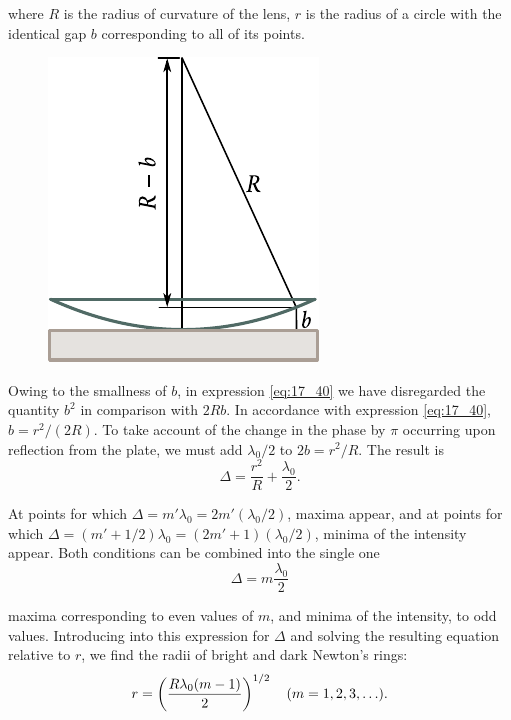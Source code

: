 \noindent
where $R$ is the radius of curvature of the lens, $r$ is the radius of a circle with the identical gap $b$ corresponding to all of its points.

\begin{figure}[t]
	\begin{center}
		\includegraphics[scale=1]{figures/ch_17/fig_17_15.pdf}
		\caption[]{}
		\label{fig:17_15}
	\end{center}
	\vspace{-0.8cm}
\end{figure}

Owing to the smallness of $b$, in expression \eqref{eq:17_40} we have disregarded the quantity $b^2$ in comparison with $2Rb$.
In accordance with expression \eqref{eq:17_40}, $b=r^2/(2R)$.
To take account of the change in the phase by $\pi$ occurring upon reflection from the plate, we must add $\lambda_0/2$ to $2b=r^2/R$.
The result is
\begin{equation}\label{eq:17_41}
    \Delta = \frac{r^2}{R} + \frac{\lambda_0}{2}.
\end{equation}

At points for which $\Delta=m'\lambda_0 = 2m'(\lambda_0/2)$, maxima appear, and at points for which $\Delta=(m'+1/2) \lambda_0 = (2m'+1)(\lambda_0/2)$, minima of the intensity appear.
Both conditions can be combined into the single one
\begin{equation*}
    \Delta = m \frac{\lambda_0}{2}
\end{equation*}

\noindent
maxima corresponding to even values of $m$, and minima of the intensity, to odd values.
Introducing into this expression  for $\Delta$ and solving the resulting equation relative to $r$, we find the radii of bright and dark Newton's rings:
\begin{equation}\label{eq:17_42}
    r = \left(\frac{R \lambda_0 (m-1)}{2}\right)^{1/2}\quad (m = 1, 2, 3, \ldots).
\end{equation}

